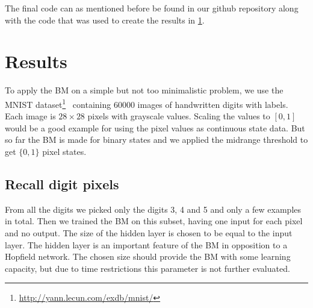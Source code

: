 \documentclass[12pt,twoside]{article}
\theoremstyle{plain}
\theoremstyle{definition}
\theoremstyle{remark}
\begin{document}
The final code can as mentioned before be found in our github repository along
with the code that was used to create the results in \cref{sec:results}.


%
%
%
%
%
%
%


\section{Results}
\label{sec:results}

To apply the BM on a simple but not too minimalistic problem, we use the MNIST dataset\footnote{\url{http://yann.lecun.com/exdb/mnist/}}~\cite{MNIST} containing $60000$ images of handwritten digits with labels. Each image is $28 \times 28$ pixels with grayscale values. Scaling the values to $[0,1]$ would be a good example for using the pixel values as continuous state data. But so far the BM is made for binary states and we applied the midrange threshold to get $\{0, 1\}$ pixel states.


\subsection{Recall digit pixels}
\label{subsec:recall}

From all the digits we picked only the digits 3, 4 and 5 and only a few examples in total. Then we trained the BM on this subset, having one input for each pixel and no output.
The size of the hidden layer is chosen to be equal to the input layer. The hidden layer is an important feature of the BM in opposition to a Hopfield network. The chosen size should provide the BM with some learning capacity, but due to time restrictions this parameter is not further evaluated.
\end{document}
